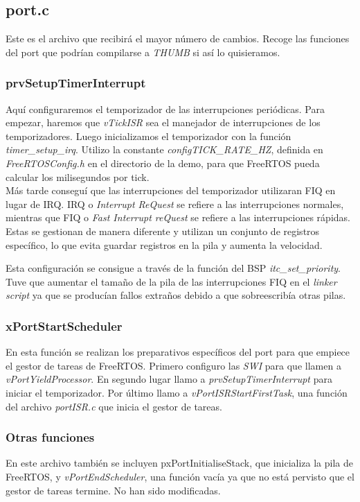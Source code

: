 \subsection{port.c}
Este es el archivo que recibirá el mayor número de cambios. Recoge las funciones del port que podrían compilarse a \emph{THUMB} si así lo quisieramos. 

\subsubsection{prvSetupTimerInterrupt}
Aquí configuraremos el temporizador de las interrupciones periódicas. Para empezar, haremos que \emph{vTickISR} sea el manejador de interrupciones de los temporizadores. Luego inicializamos el temporizador con la función \emph{timer\_setup\_irq}. Utilizo la constante \emph{configTICK\_RATE\_HZ}, definida en \emph{FreeRTOSConfig.h} en el directorio de la demo, para que FreeRTOS pueda calcular los milisegundos por tick.\\

Más tarde conseguí que las interrupciones del temporizador utilizaran FIQ en lugar de IRQ. IRQ o \emph{Interrupt ReQuest} se refiere a las interrupciones normales, mientras que FIQ o \emph{Fast Interrupt reQuest} se refiere a las interrupciones rápidas. Estas se gestionan de manera diferente y utilizan un conjunto de registros específico, lo que evita guardar registros en la pila y aumenta la velocidad.

Esta configuración se consigue a través de la función del BSP \emph{itc\_set\_priority}. Tuve que aumentar el tamaño de la pila de las interrupciones FIQ en el \emph{linker script} ya que se producían fallos extraños debido a que sobreescribía otras pilas.

\subsubsection{xPortStartScheduler}
En esta función se realizan los preparativos específicos del port para que empiece el gestor de tareas de FreeRTOS. Primero configuro las \emph{SWI} para que llamen a \emph{vPortYieldProcessor}. En segundo lugar llamo a \emph{prvSetupTimerInterrupt} para iniciar el temporizador. Por último llamo a \emph{vPortISRStartFirstTask}, una función del archivo \emph{portISR.c} que inicia el gestor de tareas.

\subsubsection{Otras funciones}
En este archivo también se incluyen pxPortInitialiseStack, que inicializa la pila de FreeRTOS, y \emph{vPortEndScheduler}, una función vacía ya que no está pervisto que el gestor de tareas termine. No han sido modificadas.

